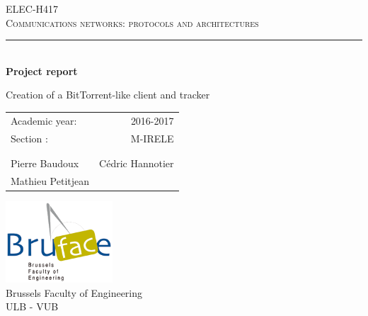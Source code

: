 \setlength{\parindent}{0cm}
\setlength{\parskip}{1ex plus 0.5ex minus 0.2ex}
\newcommand{\hsp}{\hspace{20pt}}
\newcommand{\HRule}{\rule{\linewidth}{0.5mm}}

\begin{titlepage}
  \begin{sffamily}
  \begin{center}

    \textsc{\Large ELEC-H417\\
    Communications networks: protocols and architectures}\\[4.6cm]

    \HRule \\[0.4cm]
    { \huge \bfseries Project report \\[0.4cm] }


{\Large Creation of a BitTorrent-like client and tracker\\[3cm]}
  
\begin{center}
\begin{tabular}{l r}
Academic year: & 2016-2017 \\ %
Section : & M-IRELE\\
& \\ \\
Pierre Baudoux & Cédric Hannotier \\
Mathieu Petitjean
\end{tabular}
\end{center}

    \vfill
    \includegraphics[width=0.3\textwidth]{img/bruface_logo.png}\\[0.1in]
    \Large{Brussels Faculty of Engineering}\\
    \normalsize
    \textsc{ULB - VUB}\\

    \vspace{0.2cm}

  \end{center}
  \end{sffamily}
\end{titlepage}